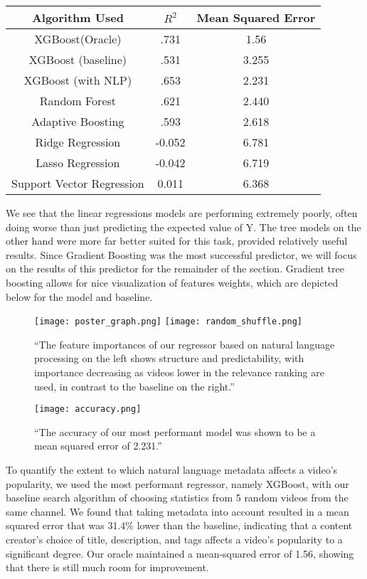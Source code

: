 \documentclass[12pt]{article}
\theoremstyle{definition}
\theoremstyle{remark}
\begin{document}
\begin{center}
\begin{tabular}{ |c|c|c| } 
 \hline
 Algorithm Used & $R^2$ & Mean Squared Error \\ 
 \hline
 \hline
  XGBoost(Oracle) & .731 & 1.56\\
 \hline
 XGBoost (baseline) & .531 & 3.255 \\ 
  \hline
 XGBoost (with NLP) & .653 & 2.231 \\ 
 \hline
 Random Forest & .621 & 2.440\\
 \hline 
 Adaptive Boosting  & .593 & 2.618\\
 \hline
 Ridge Regression & -0.052 & 6.781 \\
 \hline
 Lasso Regression & -0.042 & 6.719 \\
 \hline
 Support Vector Regression & 0.011 & 6.368\\
 \hline
\end{tabular}
\end{center}

We see that the linear regressions models are performing extremely poorly, often
doing worse than just predicting the expected value of Y. The tree models on the
other hand were more far better suited for this task, provided relatively useful
results. Since Gradient Boosting was the most successful predictor, we will
focus on the results of this predictor for the remainder of the section.
Gradient tree boosting allows for nice visualization of features weights, which
are depicted below for the model and baseline.




\begin{figure}[H]
\texttt{[image: poster\_graph.png]}
\texttt{[image: random\_shuffle.png]}
\caption{``The feature importances of our regressor based on natural language
  processing on the left shows structure and predictability, with importance
  decreasing as videos lower in the relevance ranking are used, in contrast to the
  baseline on the right.''}
\begin{centering}
\texttt{[image: accuracy.png]}
\caption{``The accuracy of our most performant model was shown to be a mean
  squared error of 2.231.''}
\end{centering}
\end{figure}

To quantify the extent to which natural language metadata affects a video's
popularity, we used the most performant regressor, namely XGBoost, with our
baseline search algorithm of choosing statistics from 5 random videos from the
same channel. We found that taking metadata into account resulted in a mean
squared error that was 31.4\% lower than the baseline, indicating that a content
creator's choice of title, description, and tags affects a video's popularity to
a significant degree. Our oracle maintained a mean-squared error of 1.56,
showing that there is still much room for improvement.
\end{document}

